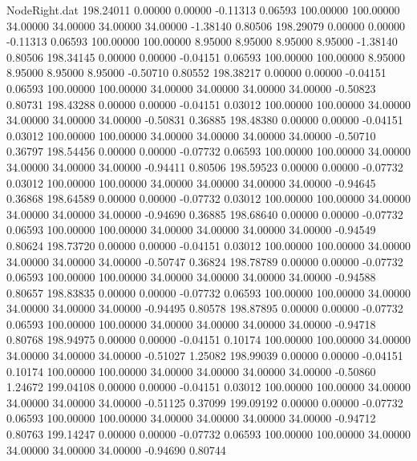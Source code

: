 \begin{filecontents}{NodeRight.dat}
 198.24011    0.00000    0.00000    -0.11313    0.06593  100.00000  100.00000   34.00000   34.00000   34.00000   34.00000   -1.38140    0.80506
 198.29079    0.00000    0.00000    -0.11313    0.06593  100.00000  100.00000    8.95000    8.95000    8.95000    8.95000   -1.38140    0.80506
 198.34145    0.00000    0.00000    -0.04151    0.06593  100.00000  100.00000    8.95000    8.95000    8.95000    8.95000   -0.50710    0.80552
 198.38217    0.00000    0.00000    -0.04151    0.06593  100.00000  100.00000   34.00000   34.00000   34.00000   34.00000   -0.50823    0.80731
 198.43288    0.00000    0.00000    -0.04151    0.03012  100.00000  100.00000   34.00000   34.00000   34.00000   34.00000   -0.50831    0.36885
 198.48380    0.00000    0.00000    -0.04151    0.03012  100.00000  100.00000   34.00000   34.00000   34.00000   34.00000   -0.50710    0.36797
 198.54456    0.00000    0.00000    -0.07732    0.06593  100.00000  100.00000   34.00000   34.00000   34.00000   34.00000   -0.94411    0.80506
 198.59523    0.00000    0.00000    -0.07732    0.03012  100.00000  100.00000   34.00000   34.00000   34.00000   34.00000   -0.94645    0.36868
 198.64589    0.00000    0.00000    -0.07732    0.03012  100.00000  100.00000   34.00000   34.00000   34.00000   34.00000   -0.94690    0.36885
 198.68640    0.00000    0.00000    -0.07732    0.06593  100.00000  100.00000   34.00000   34.00000   34.00000   34.00000   -0.94549    0.80624
 198.73720    0.00000    0.00000    -0.04151    0.03012  100.00000  100.00000   34.00000   34.00000   34.00000   34.00000   -0.50747    0.36824
 198.78789    0.00000    0.00000    -0.07732    0.06593  100.00000  100.00000   34.00000   34.00000   34.00000   34.00000   -0.94588    0.80657
 198.83835    0.00000    0.00000    -0.07732    0.06593  100.00000  100.00000   34.00000   34.00000   34.00000   34.00000   -0.94495    0.80578
 198.87895    0.00000    0.00000    -0.07732    0.06593  100.00000  100.00000   34.00000   34.00000   34.00000   34.00000   -0.94718    0.80768
 198.94975    0.00000    0.00000    -0.04151    0.10174  100.00000  100.00000   34.00000   34.00000   34.00000   34.00000   -0.51027    1.25082
 198.99039    0.00000    0.00000    -0.04151    0.10174  100.00000  100.00000   34.00000   34.00000   34.00000   34.00000   -0.50860    1.24672
 199.04108    0.00000    0.00000    -0.04151    0.03012  100.00000  100.00000   34.00000   34.00000   34.00000   34.00000   -0.51125    0.37099
 199.09192    0.00000    0.00000    -0.07732    0.06593  100.00000  100.00000   34.00000   34.00000   34.00000   34.00000   -0.94712    0.80763
 199.14247    0.00000    0.00000    -0.07732    0.06593  100.00000  100.00000   34.00000   34.00000   34.00000   34.00000   -0.94690    0.80744

\end{filecontents}
